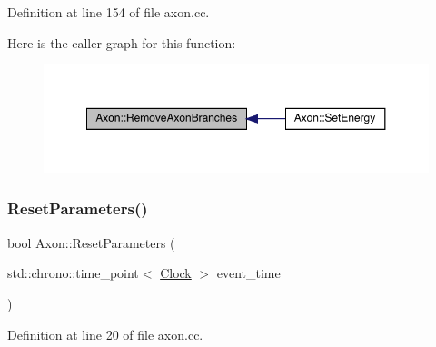 Definition at line 154 of file axon.\+cc.

Here is the caller graph for this function\+:
\nopagebreak
\begin{figure}[H]
\begin{center}
\leavevmode
\includegraphics[width=350pt]{class_axon_a4c7af6c0900ae766c55362bfbb827ce3_icgraph}
\end{center}
\end{figure}
\mbox{\label{class_axon_ae079e0b47f5027625da158930e4fa9c5}} 
\subsubsection{\texorpdfstring{Reset\+Parameters()}{ResetParameters()}}
{\footnotesize\ttfamily bool Axon\+::\+Reset\+Parameters (\begin{DoxyParamCaption}\item[{std\+::chrono\+::time\+\_\+point$<$ \hyperlink{universe_8h_a0ef8d951d1ca5ab3cfaf7ab4c7a6fd80}{Clock} $>$}]{event\+\_\+time }\end{DoxyParamCaption})}



Definition at line 20 of file axon.\+cc.

